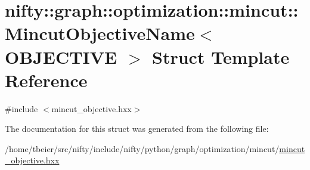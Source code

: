 \hypertarget{structnifty_1_1graph_1_1optimization_1_1mincut_1_1MincutObjectiveName}{}\section{nifty\+:\+:graph\+:\+:optimization\+:\+:mincut\+:\+:Mincut\+Objective\+Name$<$ O\+B\+J\+E\+C\+T\+I\+V\+E $>$ Struct Template Reference}
\label{structnifty_1_1graph_1_1optimization_1_1mincut_1_1MincutObjectiveName}


{\ttfamily \#include $<$mincut\+\_\+objective.\+hxx$>$}



The documentation for this struct was generated from the following file\+:\begin{DoxyCompactItemize}
\item 
/home/tbeier/src/nifty/include/nifty/python/graph/optimization/mincut/\hyperlink{python_2graph_2optimization_2mincut_2mincut__objective_8hxx}{mincut\+\_\+objective.\+hxx}\end{DoxyCompactItemize}
